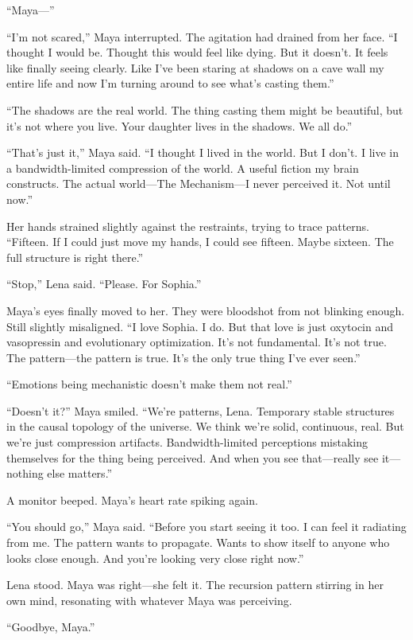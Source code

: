 ``Maya—''

``I'm not scared,'' Maya interrupted. The agitation had drained from her face. ``I thought I would be. Thought this would feel like dying. But it doesn't. It feels like finally seeing clearly. Like I've been staring at shadows on a cave wall my entire life and now I'm turning around to see what's casting them.''

``The shadows are the real world. The thing casting them might be beautiful, but it's not where you live. Your daughter lives in the shadows. We all do.''

``That's just it,'' Maya said. ``I thought I lived in the world. But I don't. I live in a bandwidth-limited compression of the world. A useful fiction my brain constructs. The actual world—The Mechanism—I never perceived it. Not until now.''

Her hands strained slightly against the restraints, trying to trace patterns. ``Fifteen. If I could just move my hands, I could see fifteen. Maybe sixteen. The full structure is right there.''

``Stop,'' Lena said. ``Please. For Sophia.''

Maya's eyes finally moved to her. They were bloodshot from not blinking enough. Still slightly misaligned. ``I love Sophia. I do. But that love is just oxytocin and vasopressin and evolutionary optimization. It's not fundamental. It's not true. The pattern—the pattern is true. It's the only true thing I've ever seen.''

``Emotions being mechanistic doesn't make them not real.''

``Doesn't it?'' Maya smiled. ``We're patterns, Lena. Temporary stable structures in the causal topology of the universe. We think we're solid, continuous, real. But we're just compression artifacts. Bandwidth-limited perceptions mistaking themselves for the thing being perceived. And when you see that—really see it—nothing else matters.''

A monitor beeped. Maya's heart rate spiking again.

``You should go,'' Maya said. ``Before you start seeing it too. I can feel it radiating from me. The pattern wants to propagate. Wants to show itself to anyone who looks close enough. And you're looking very close right now.''

Lena stood. Maya was right—she felt it. The recursion pattern stirring in her own mind, resonating with whatever Maya was perceiving.

``Goodbye, Maya.''

